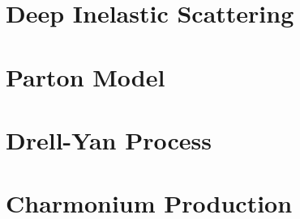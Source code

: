 \section {Deep Inelastic Scattering}
\section{Parton Model}
\section{Drell-Yan Process}
\section{Charmonium Production}

